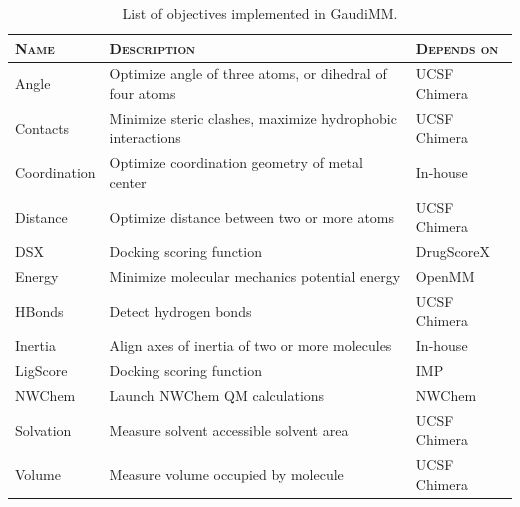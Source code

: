\begin{table}[hbtp]
	\caption[List of objectives implemented in GaudiMM]{List of objectives implemented in GaudiMM.}
	\label{table:gaudi-objectives}
\footnotesize
{}%
%
%
\begin{tabularx}{\textwidth}{LMR}
\toprule
\textsc{Name} & \textsc{Description} & \textsc{Depends on} \\
\toprule
 Angle & Optimize angle of three atoms, or dihedral of four atoms & UCSF Chimera \\
\hhline{~~~}
 Contacts & Minimize steric clashes, maximize hydrophobic interactions & UCSF Chimera \\
\hhline{~~~}
 Coordination & Optimize coordination geometry of metal center & In-house \\
\hhline{~~~}
 Distance & Optimize distance between two or more atoms & UCSF Chimera \\
\hhline{~~~}
 DSX & Docking scoring function  & DrugScoreX \\
\hhline{~~~}
 Energy & Minimize molecular mechanics potential energy & OpenMM \\
\hhline{~~~}
 HBonds & Detect hydrogen bonds  & UCSF Chimera \\
\hhline{~~~}
 Inertia & Align axes of inertia of two or more molecules & In-house \\
\hhline{~~~}
 LigScore & Docking scoring function & IMP \\
\hhline{~~~}
 NWChem & Launch NWChem QM calculations & NWChem \\
\hhline{~~~}
 Solvation & Measure solvent accessible solvent area & UCSF Chimera \\
\hhline{~~~}
 Volume & Measure volume occupied by molecule & UCSF Chimera \\
\bottomrule

\end{tabularx}
 \end{table}





